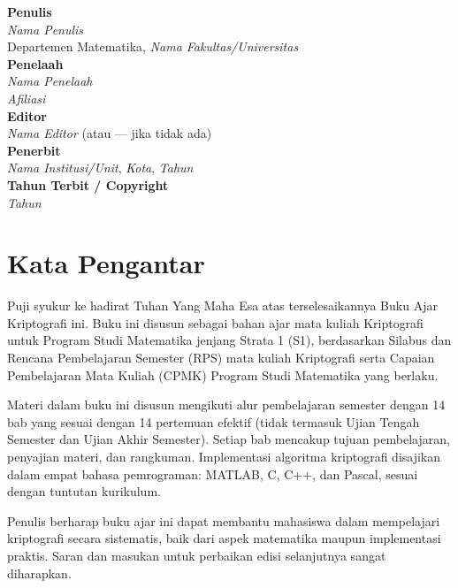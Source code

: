 \documentclass[12pt,a4paper]{book}
\begin{document}
\noindent
\textbf{Penulis}\\[0.3em]
\textit{Nama Penulis}\\
Departemen Matematika, \textit{Nama Fakultas/Universitas}\\[0.8cm]

\noindent
\textbf{Penelaah}\\[0.3em]
\textit{Nama Penelaah}\\
\textit{Afiliasi}\\[0.8cm]

\noindent
\textbf{Editor}\\[0.3em]
\textit{Nama Editor} \quad (atau --- jika tidak ada)\\[0.8cm]

\noindent
\textbf{Penerbit}\\[0.3em]
\textit{Nama Institusi/Unit}, \textit{Kota}, \textit{Tahun}\\[0.5cm]

\noindent
\textbf{Tahun Terbit / Copyright}\\[0.3em]
\textit{Tahun}

\frontmatter
\newpage
\thispagestyle{empty}

\chapter*{Kata Pengantar}

Puji syukur ke hadirat Tuhan Yang Maha Esa atas terselesaikannya Buku Ajar Kriptografi ini. Buku ini disusun sebagai bahan ajar mata kuliah Kriptografi untuk Program Studi Matematika jenjang Strata 1 (S1), berdasarkan Silabus dan Rencana Pembelajaran Semester (RPS) mata kuliah Kriptografi serta Capaian Pembelajaran Mata Kuliah (CPMK) Program Studi Matematika yang berlaku.

Materi dalam buku ini disusun mengikuti alur pembelajaran semester dengan 14 bab yang sesuai dengan 14 pertemuan efektif (tidak termasuk Ujian Tengah Semester dan Ujian Akhir Semester). Setiap bab mencakup tujuan pembelajaran, penyajian materi, dan rangkuman. Implementasi algoritma kriptografi disajikan dalam empat bahasa pemrograman: MATLAB, C, C++, dan Pascal, sesuai dengan tuntutan kurikulum.

Penulis berharap buku ajar ini dapat membantu mahasiswa dalam mempelajari kriptografi secara sistematis, baik dari aspek matematika maupun implementasi praktis. Saran dan masukan untuk perbaikan edisi selanjutnya sangat diharapkan.
\end{document}
